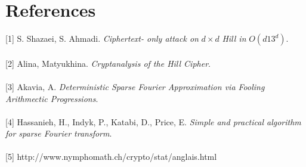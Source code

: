 \documentclass{article}
\begin{document}
\section*{References}
[1] S. Shazaei, S. Ahmadi. \textit{Ciphertext- only attack on} $d \times d$ \textit{Hill in} $O(d13^d)$.\\
\\[0pt]
[2] Alina, Matyukhina. \textit{Cryptanalysis of the Hill Cipher}.\\
\\[0pt]
[3] Akavia, A. \textit{Deterministic Sparse Fourier Approximation via Fooling Arithmectic Progressions}.\\
\\[0pt]
[4] Hassanieh, H., Indyk, P., Katabi, D., Price, E. \textit{Simple and practical algorithm for sparse Fourier transform}.\\
\\[0pt]
[5] http://www.nymphomath.ch/crypto/stat/anglais.html\\
\end{document}
